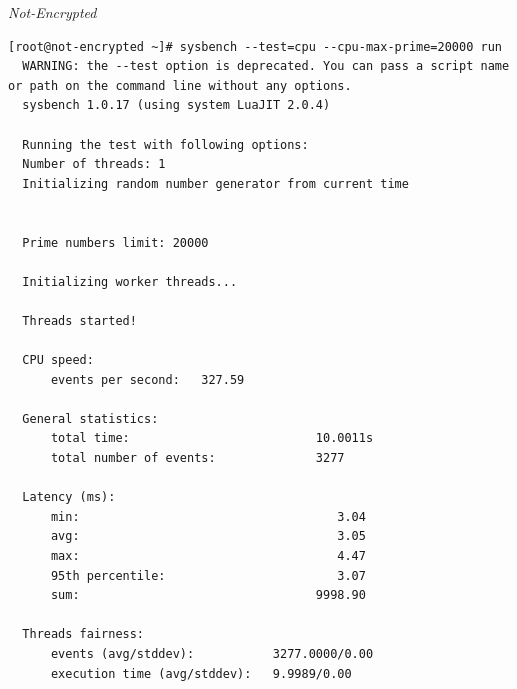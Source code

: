\noindent\begin{minipage}[t]{0.45\linewidth}
  \centering
  \textit{Not-Encrypted}
  \begin{lstlisting}[basicstyle=\tiny,frame=single, label=cpu_test2]
  [root@not-encrypted ~]# sysbench --test=cpu --cpu-max-prime=20000 run
  WARNING: the --test option is deprecated. You can pass a script name or path on the command line without any options.
  sysbench 1.0.17 (using system LuaJIT 2.0.4)
  
  Running the test with following options:
  Number of threads: 1
  Initializing random number generator from current time
  
  
  Prime numbers limit: 20000
  
  Initializing worker threads...
  
  Threads started!
  
  CPU speed:
      events per second:   327.59
  
  General statistics:
      total time:                          10.0011s
      total number of events:              3277
  
  Latency (ms):
      min:                                    3.04
      avg:                                    3.05
      max:                                    4.47
      95th percentile:                        3.07
      sum:                                 9998.90
  
  Threads fairness:
      events (avg/stddev):           3277.0000/0.00
      execution time (avg/stddev):   9.9989/0.00
  \end{lstlisting}
\end{minipage}

\newpage
